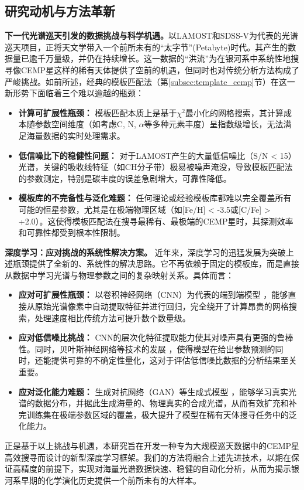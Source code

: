 \subsection{研究动机与方法革新}
\label{subsec:motivation_dl}

\textbf{下一代光谱巡天引发的数据挑战与科学机遇。}以LAMOST和SDSS-V为代表的光谱巡天项目，正将天文学带入一个前所未有的“太字节”(Petabyte)时代。其产生的数据量已逾千万量级，并仍在持续增长。这一数据的“洪流”为在银河系中系统性地搜寻像CEMP星这样的稀有天体提供了空前的机遇，但同时也对传统分析方法构成了严峻挑战。如前所述，经典的模板匹配法（第\ref{subsec:template_cemp}节）在这一新形势下面临着三个难以逾越的瓶颈：

\begin{itemize}
    \item \textbf{计算可扩展性瓶颈：} 模板匹配本质上是基于$\chi^2$最小化的网格搜索，其计算成本随参数空间维度（如考虑C, N, $\alpha$等多种元素丰度）呈指数级增长，无法满足海量数据的实时处理需求。
    \item \textbf{低信噪比下的稳健性问题：} 对于LAMOST产生的大量低信噪比（S/N < 15）光谱，关键的吸收线特征（如CH分子带）极易被噪声淹没，导致模板匹配法的参数测定，特别是碳丰度的误差急剧增大，可靠性降低。
    \item \textbf{模板库的不完备性与泛化难题：} 任何理论或经验模板库都难以完全覆盖所有可能的恒星参数，尤其是在极端物理区域（如[Fe/H] < -3.5或[C/Fe] > +2.0）。这使得模板匹配法在搜寻最稀有、最极端的CEMP星时，其探测效率和可靠性都受到根本性限制。
\end{itemize}

\textbf{深度学习：应对挑战的系统性解决方案。} 近年来，深度学习的迅猛发展为突破上述瓶颈提供了全新的、系统性的解决思路。它不再依赖于固定的模板库，而是直接从数据中学习光谱与物理参数之间的复杂映射关系。具体而言：

\begin{itemize}
    \item \textbf{应对可扩展性瓶颈：} 以卷积神经网络（CNN）为代表的端到端模型 \cite{ting2019}，能够直接从原始光谱像素中自动提取特征并进行回归，完全绕开了计算昂贵的网格搜索，处理速度相比传统方法可提升数个数量级。
    \item \textbf{应对低信噪比挑战：} CNN的层次化特征提取能力使其对噪声具有更强的鲁棒性。同时，贝叶斯神经网络等技术的发展 \cite{bayescnn2022}，使得模型在给出参数预测的同时，还能提供可靠的不确定性量化，这对于评估低信噪比数据的分析结果至关重要。
    \item \textbf{应对泛化能力难题：} 生成对抗网络（GAN）等生成式模型 \cite{zhang2021_gan}，能够学习真实光谱的数据分布，并据此生成海量的、物理真实的合成光谱，从而有效扩充和补完训练集在极端参数区域的覆盖，极大提升了模型在稀有天体搜寻任务中的泛化能力。
\end{itemize}

正是基于以上挑战与机遇，本研究旨在开发一种专为大规模巡天数据中的CEMP星高效搜寻而设计的新型深度学习框架。我们的方法将融合上述先进技术，以期在保证高精度的前提下，实现对海量光谱数据快速、稳健的自动化分析，从而为揭示银河系早期的化学演化历史提供一个前所未有的大样本。
